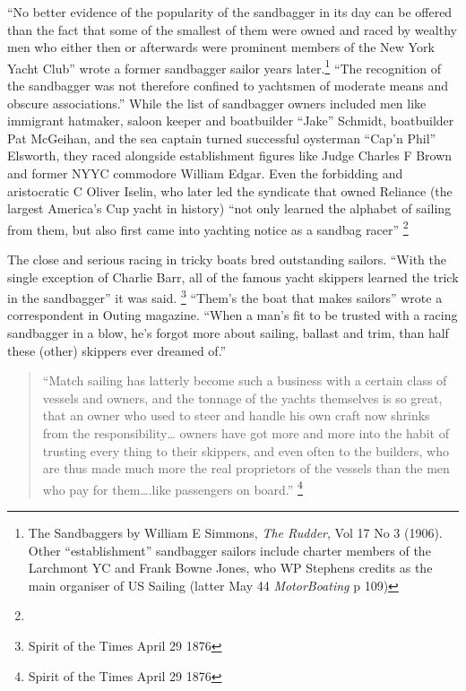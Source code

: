 \documentclass[
  letterpaper,
]{scrbook}
\begin{document}
``No better evidence of the popularity of the sandbagger in its day can
be offered than the fact that some of the smallest of them were owned
and raced by wealthy men who either then or afterwards were prominent
members of the New York Yacht Club'' wrote a former sandbagger sailor
years later.\footnote{The Sandbaggers by William E Simmons, \emph{The
  Rudder}, Vol 17 No 3 (1906). Other ``establishment'' sandbagger
  sailors include charter members of the Larchmont YC and Frank Bowne
  Jones, who WP Stephens credits as the main organiser of US Sailing
  (latter May 44 \emph{MotorBoating} p 109)} ``The recognition of the
sandbagger was not therefore confined to yachtsmen of moderate means and
obscure associations.'' While the list of sandbagger owners included men
like immigrant hatmaker, saloon keeper and boatbuilder ``Jake'' Schmidt,
boatbuilder Pat McGeihan, and the sea captain turned successful
oysterman ``Cap'n Phil'' Elsworth, they raced alongside establishment
figures like Judge Charles F Brown and former NYYC commodore William
Edgar. Even the forbidding and aristocratic C Oliver Iselin, who later
led the syndicate that owned Reliance (the largest America's Cup yacht
in history) ``not only learned the alphabet of sailing from them, but
also first came into yachting notice as a sandbag racer'' \footnote{}

The close and serious racing in tricky boats bred outstanding sailors.
``With the single exception of Charlie Barr, all of the famous yacht
skippers learned the trick in the sandbagger'' it was said. \footnote{Spirit
  of the Times April 29 1876} ``Them's the boat that makes sailors''
wrote a correspondent in Outing magazine. ``When a man's fit to be
trusted with a racing sandbagger in a blow, he's forgot more about
sailing, ballast and trim, than half these (other) skippers ever dreamed
of.''

\begin{quote}
``Match sailing has latterly become such a business with a certain class
of vessels and owners, and the tonnage of the yachts themselves is so
great, that an owner who used to steer and handle his own craft now
shrinks from the responsibility\ldots{} owners have got more and more
into the habit of trusting every thing to their skippers, and even often
to the builders, who are thus made much more the real proprietors of the
vessels than the men who pay for them\ldots.like passengers on board.''
\footnote{Spirit of the Times April 29 1876}
\end{quote}
\end{document}
